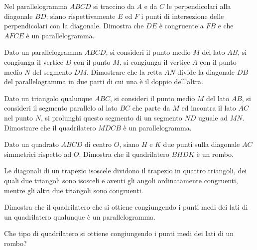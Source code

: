 \begin{multicols}{2}
\begin{esercizio}
\label{ese:4.44}
Nel parallelogramma $ABCD$ si traccino da $A$ e da $C$ le perpendicolari alla diagonale $BD$; siano rispettivamente $E$ ed $F$ i punti di intersezione delle perpendicolari con la diagonale. Dimostra che $DE$ è congruente a $FB$ e che $AFCE$ è un parallelogramma.
\end{esercizio}

\begin{esercizio}
\label{ese:4.45}
Dato un parallelogramma $ABCD$, si consideri il punto medio $M$ del lato $AB$, si congiunga il vertice $D$ con il punto $M$, si congiunga il vertice $A$ con il punto medio $N$ del segmento $DM$. Dimostrare che la retta $AN$ divide la diagonale $DB$ del parallelogramma in due parti di cui una è il doppio dell'altra.	
\end{esercizio}

\begin{esercizio}
\label{ese:4.46}
Dato un triangolo qualunque $ABC$, si consideri il punto medio $M$ del lato $AB$, si consideri il segmento parallelo al lato $BC$ che parte da $M$ ed incontra il lato $AC$ nel punto $N$, si prolunghi questo segmento di un segmento $ND$ uguale ad $MN$. Dimostrare che il quadrilatero $MDCB$ è un parallelogramma.
\end{esercizio}

\begin{esercizio}
\label{ese:4.47}
Dato un quadrato $ABCD$ di centro $O$, siano $H$ e $K$ due punti sulla diagonale $AC$ simmetrici rispetto ad $O$. Dimostra che il quadrilatero $BHDK$ è un rombo.
\end{esercizio}

\begin{esercizio}
\label{ese:4.48}
Le diagonali di un trapezio isoscele dividono il trapezio in quattro triangoli, dei quali due triangoli sono isosceli e aventi gli angoli ordinatamente congruenti, mentre gli altri due triangoli sono congruenti.
\end{esercizio}

\begin{esercizio}
\label{ese:4.49}
Dimostra che il quadrilatero che si ottiene congiungendo i punti medi dei lati di un quadrilatero qualunque è un parallelogramma.
\end{esercizio}

\begin{esercizio}
\label{ese:4.50}
Che tipo di quadrilatero si ottiene congiungendo i punti medi dei lati di un rombo?
\end{esercizio}


\end{multicols}
